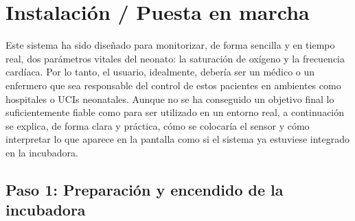 
\section{Instalación / Puesta en marcha}

Este sistema ha sido diseñado para monitorizar, de forma sencilla y en tiempo real, dos parámetros vitales del neonato: la saturación de oxígeno y la frecuencia cardíaca. Por lo tanto, el usuario, idealmente, debería ser un médico o un enfermero que sea responsable del control de estos pacientes en ambientes como hospitales o UCIs neonatales. Aunque no se ha conseguido un objetivo final lo suficientemente fiable como para ser utilizado en un entorno real, a continuación se explica, de forma clara y práctica, cómo se colocaría el sensor y cómo interpretar lo que aparece en la pantalla como si el sistema ya estuviese integrado en la incubadora.

\subsection{Paso 1: Preparación y encendido de la incubadora}

